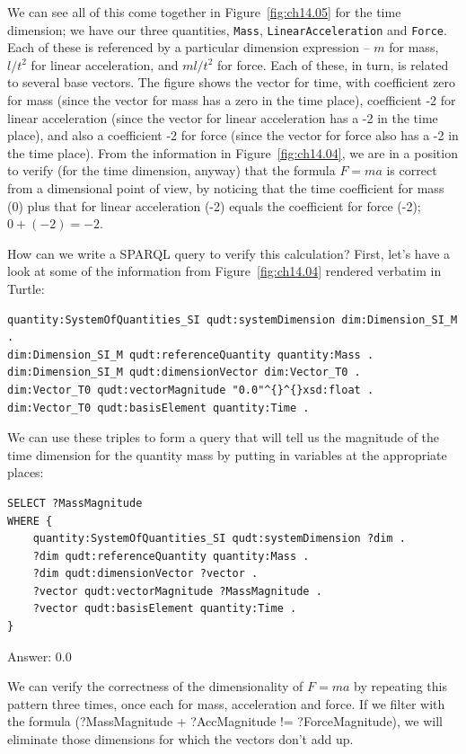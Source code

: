 We can see all of this come together in Figure~\ref{fig:ch14.05} for the time
dimension; we have our three
quantities, \texttt{Mass}, \texttt{LinearAcceleration} and \texttt{Force}. 
Each of these is
referenced by a particular dimension expression -- $m$ for mass, $l/{t^2}$ for
linear acceleration, and $ml/{t^2}$ for force. Each of these, in turn, is
related to several base vectors. The figure shows the vector for time,
with coefficient zero for mass (since the vector for mass has a zero in
the time place), coefficient -2 for linear acceleration
(since the vector for linear acceleration has a -2 in the time place),
and also a coefficient -2 for force (since the vector for force also has
a -2 in the time place). From the information in Figure~\ref{fig:ch14.04}, 
we are in
a position to verify (for the time dimension, anyway) that the formula $F = ma$ 
is correct from a dimensional point of view, by noticing that the
time coefficient for mass (0) plus that for linear acceleration (-2)
equals the coefficient for force (-2); $0 + (-2) = -2$.

How can we write a SPARQL query to verify this calculation? First, let's
have a look at some of the information from Figure~\ref{fig:ch14.04} rendered
verbatim in Turtle:

\begin{lstlisting}
quantity:SystemOfQuantities_SI qudt:systemDimension dim:Dimension_SI_M .
dim:Dimension_SI_M qudt:referenceQuantity quantity:Mass .
dim:Dimension_SI_M qudt:dimensionVector dim:Vector_T0 .
dim:Vector_T0 qudt:vectorMagnitude "0.0"^{}^{}xsd:float .
dim:Vector_T0 qudt:basisElement quantity:Time .
\end{lstlisting}

We can use these triples to form a query that will tell us the magnitude
of the time dimension for the quantity mass by putting in variables at
the appropriate places:

\begin{lstlisting}
SELECT ?MassMagnitude
WHERE {
    quantity:SystemOfQuantities_SI qudt:systemDimension ?dim .
    ?dim qudt:referenceQuantity quantity:Mass .
    ?dim qudt:dimensionVector ?vector .
    ?vector qudt:vectorMagnitude ?MassMagnitude .
    ?vector qudt:basisElement quantity:Time .
}
\end{lstlisting}

Answer: 0.0

We can verify the correctness of the dimensionality of $F = ma$ by
repeating this pattern three times, once each for mass, acceleration and
force. If we filter with the formula 
(?MassMagnitude + ?AccMagnitude != ?ForceMagnitude), we will eliminate those 
dimensions
for which the vectors
don't add up.


